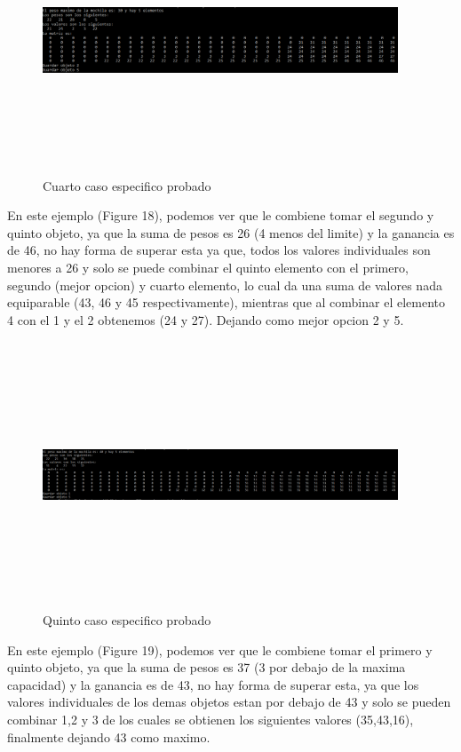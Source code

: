 \documentclass[spanish]{article}
\begin{document}
	\begin{figure}[H]
		\centering
		\includegraphics[width=400px,height=300px]{casoEspecifico4}
		\caption{Cuarto caso especifico probado}
	\end{figure}
	En este ejemplo (Figure 18), podemos ver que le combiene tomar el segundo y quinto objeto, ya que la suma de pesos es 26 (4 menos del limite) y la ganancia es de 46, no hay forma de superar esta ya que, todos los valores individuales son menores a 26 y solo se puede combinar el quinto elemento con el primero, segundo (mejor opcion) y cuarto elemento, lo cual da una suma de valores nada equiparable (43, 46 y 45 respectivamente), mientras que al combinar el elemento 4 con el 1 y el 2 obtenemos (24 y 27). Dejando como mejor opcion 2 y 5.
	\begin{figure}[H]
		\centering
		\includegraphics[width=400px,height=300px]{casoEspecifico5}
		\caption{Quinto caso especifico probado}
	\end{figure}
	En este ejemplo (Figure 19), podemos ver que le combiene tomar el primero y quinto objeto, ya que la suma de pesos es 37 (3 por debajo de la maxima capacidad) y la ganancia es de 43, no hay forma de superar esta, ya que los valores individuales de los demas objetos estan por debajo de 43 y solo se pueden combinar 1,2 y 3 de los cuales se obtienen los siguientes valores (35,43,16), finalmente dejando 43 como maximo.\\
\end{document}
